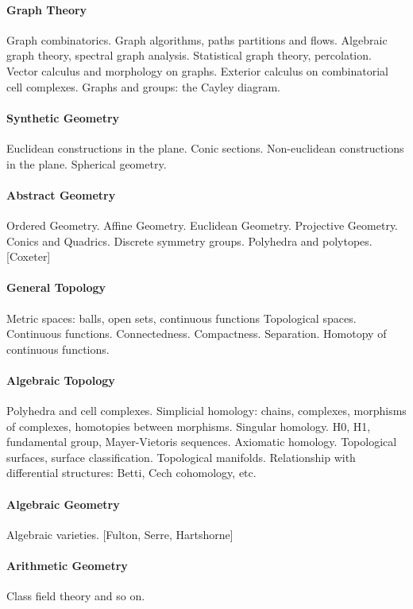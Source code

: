 \paragraph{Graph Theory}
Graph combinatorics.
Graph algorithms, paths partitions and flows.
Algebraic graph theory, spectral graph analysis.
Statistical graph theory, percolation.
Vector calculus and morphology on graphs.
Exterior calculus on combinatorial cell complexes.
Graphs and groups: the Cayley diagram.

\paragraph{Synthetic Geometry}
Euclidean constructions in the plane.
Conic sections.
Non-euclidean constructions in the plane.
Spherical geometry.

\paragraph{Abstract Geometry}
Ordered Geometry.
Affine Geometry.
Euclidean Geometry.
Projective Geometry.
Conics and Quadrics.
Discrete symmetry groups.
Polyhedra and polytopes.
[Coxeter]

\paragraph{General Topology}
Metric spaces: balls, open sets, continuous functions
Topological spaces.  Continuous functions.
Connectedness.  Compactness.  Separation.
Homotopy of continuous functions.

\paragraph{Algebraic Topology}
Polyhedra and cell complexes.
Simplicial homology: chains, complexes, morphisms of complexes, homotopies
between morphisms.
Singular homology.  H0, H1, fundamental group, Mayer-Vietoris sequences.
Axiomatic homology.
Topological surfaces, surface classification.  Topological manifolds.
Relationship with differential structures: Betti, Cech cohomology, etc.

\paragraph{Algebraic Geometry}
Algebraic varieties.
[Fulton, Serre, Hartshorne]

\paragraph{Arithmetic Geometry}
Class field theory and so on.


